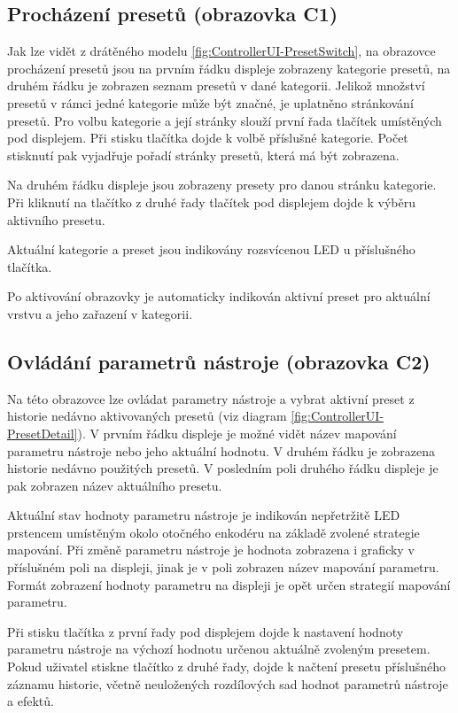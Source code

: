 \documentclass[thesis=M,czech]{FITthesis}[2019/03/06]
\begin{document}
		\subsection{Procházení presetů (obrazovka C1)}\label{sec:C1}
			Jak lze vidět z drátěného modelu \ref{fig:ControllerUI-PresetSwitch}, na obrazovce procházení presetů jsou na prvním řádku displeje
			zobrazeny kategorie presetů, na druhém řádku je zobrazen seznam presetů v dané kategorii.
			Jelikož množství presetů v rámci jedné kategorie může být značné, je uplatněno stránkování presetů.
			Pro volbu kategorie a její stránky slouží první řada tlačítek umístěných pod displejem.
			Při stisku tlačítka dojde k volbě příslušné kategorie. Počet stisknutí pak vyjadřuje pořadí stránky presetů, která má být zobrazena.
			
			Na druhém řádku displeje jsou zobrazeny presety pro danou stránku kategorie. Při kliknutí na tlačítko 
			z druhé řady tlačítek pod displejem dojde k výběru aktivního presetu.
			
			Aktuální kategorie a preset jsou indikovány rozsvícenou LED u příslušného tlačítka.
			
			Po aktivování obrazovky je automaticky indikován aktivní preset pro
			aktuální vrstvu a jeho zařazení v kategorii.
			
		\subsection{Ovládání parametrů nástroje (obrazovka C2)}\label{sec:C2}
			Na této obrazovce lze ovládat parametry nástroje a vybrat aktivní preset z historie nedávno aktivovaných presetů (viz diagram \ref{fig:ControllerUI-PresetDetail}).
			V prvním řádku displeje je možné vidět název mapování parametru nástroje nebo jeho aktuální hodnotu. V druhém řádku
			je zobrazena historie nedávno použitých presetů. V posledním poli druhého řádku displeje je pak zobrazen název
			aktuálního presetu.
			
			Aktuální stav hodnoty parametru nástroje je indikován nepřetržitě LED prstencem umístěným okolo otočného enkodéru na základě
			zvolené strategie mapování. Při změně parametru nástroje je hodnota zobrazena i graficky v příslušném poli na displeji, jinak je v poli zobrazen název mapování parametru.
			Formát zobrazení hodnoty parametru na displeji je opět určen strategií mapování parametru.
			
			Při stisku tlačítka z první řady pod displejem dojde k nastavení hodnoty parametru nástroje na výchozí hodnotu určenou aktuálně zvoleným presetem.		
			Pokud uživatel stiskne tlačítko z druhé řady, dojde k načtení presetu příslušného záznamu historie, včetně neuložených rozdílových sad hodnot parametrů nástroje a efektů.
			
\end{document}
